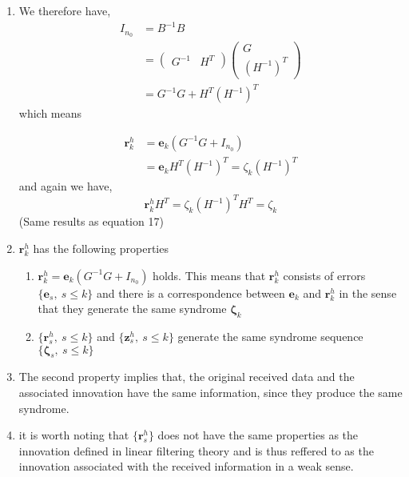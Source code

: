 \documentclass[fontsize=12pt]{article}
\theoremstyle{definition}
\begin{document}
\begin{enumerate}
\item We therefore have,
\begin{equation}
\begin{aligned}
I_{n_{0}} &=B^{-1} B \\
&=\left(\begin{array}{cc}
{G^{-1}} & {H^{T}}
\end{array}\right)\left(\begin{array}{c}
{G} \\
{\left(H^{-1}\right)^{T}}
\end{array}\right) \\
&=G^{-1} G+H^{T}\left(H^{-1}\right)^{T}
\end{aligned}
\end{equation}
which means 

\begin{equation}
\begin{aligned}
\mathbf{r}^h_k &=\mathbf{e}_k(G^{-1} G +I_{n_0})\\
& = \mathbf{e}_kH^{T}(H^{-1})^{T}  = \zeta_k(H^{-1})^{T}
\end{aligned}
\end{equation}
 and again we have, 
\begin{equation}
\mathbf{r}^h_kH^T =\zeta_k(H^{-1})^{T}H^T = \zeta_k
\end{equation}
(Same results as equation 17)

\item $\mathbf{r}^h_k$ has the following properties
\begin{enumerate}
\item $\mathbf{r}^h_k =\mathbf{e}_k(G^{-1} G +I_{n_0})$ holds. This means that $\mathbf{r}^h_k $ consists of errors $\{\mathbf{e}_s,~s \leq k\} $ and there is a correspondence between $\mathbf{e}_k$ and $\mathbf{r}_k^h$ in the sense that they generate the same syndrome $\mathbf{\zeta}_k$

\item $\{\mathbf{r}_s^h,~s \leq k\} $ and $\{\mathbf{z}_s^h,~s \leq k\} $ generate the same syndrome sequence $\{\mathbf{\zeta}_s,~s \leq k\} $ 
\end{enumerate} 

\item The second property implies that, the original received data and the associated innovation have the same information, since they produce the same syndrome.

\item it is worth noting that $\{\mathbf{r}_s^h\}$ does not have the same properties as the innovation defined in linear filtering theory and is thus reffered to as the innovation associated with the received information in a weak sense.


\end{enumerate}
\end{document}
